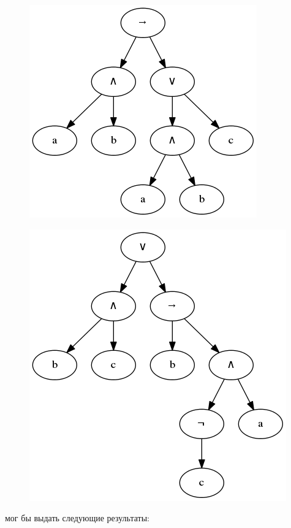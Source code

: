 \documentclass[12pt,fleqn]{article}
\begin{document}
\begin{figure}[!h]
  \centering
    \includegraphics[scale=0.45]{t1.png}
\end{figure}

\begin{figure}[!h]
  \centering
    \includegraphics[scale=0.45]{t2.png}
\end{figure}

\FloatBarrier

мог бы выдать следующие результаты:

\FloatBarrier
\end{document}
